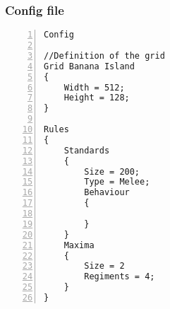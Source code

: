 		\subsubsection{Config file}
					\begin{lstlisting}[basicstyle=\small\sffamily,
					keywords={break,case,const,continue,default,else,enum,
					for,if,return,switch,while,do,long,void,int,float,double,
					char,struct,typedef,include,size\_t},
					keywordstyle={\color{blue}},
					comment={[l]{//}}, morecomment={[s]{/*}{*/}}, commentstyle=\itshape,
					columns={[l]flexible}, numbers=left, numberstyle=\tiny,
					frameround=fftt, frame=shadowbox, captionpos=b,
					caption={Config file},
					label=LST:code32]
Config

//Definition of the grid
Grid Banana Island
{
	Width = 512;
	Height = 128;
}

Rules
{
	Standards
	{
		Size = 200;
		Type = Melee;
		Behaviour
		{
			
		}
	}
	Maxima
	{
		Size = 2
		Regiments = 4;
	}
}
\end{lstlisting}				